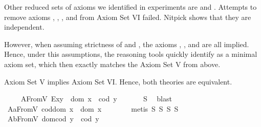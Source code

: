 \begin{isabellebody}
\begin{isamarkuptext}
   Other reduced sets of axioms we identified in experiments are  and
    . Attempts to remove axioms , , 
    , and  from Axiom Set VI failed. Nitpick shows that they are independent. 

   However, when assuming strictness of  and , the axioms , 
   ,  and  are all implied. Hence, under this 
   assumptions, the reasoning tools quickly identify  as a minimal axiom 
   set, which then exactly matches the Axiom Set V from above.%
\end{isamarkuptext}\isamarkuptrue%
%
\begin{isamarkuptext}%
Axiom Set V implies Axiom Set VI. Hence, both theories are equivalent.%
\end{isamarkuptext}\isamarkuptrue%
\isanewline
\ \ \isamarkupfalse%
\ \ A{}FromV{\isacharcolon}\ {\isachardoublequoteopen}E{\isacharparenleft}x{\isasymcdot}y{\isacharparenright}\ \isactrlbold {\isasymleftrightarrow}\ dom\ x\ {\isasymsimeq}\ cod\ y{\isachardoublequoteclose}\ \isanewline
%
\isadelimproof
\ \ \ \ %
\endisadelimproof
%
\isatagproof
{}\isamarkupfalse%
\ S{}\ \isamarkupfalse%
\ blast%
\endisatagproof
{\isafoldproof}%
%
\isadelimproof
\isanewline
%
\endisadelimproof
\ \ \isamarkupfalse%
\ A{}aFromV{\isacharcolon}\ {\isachardoublequoteopen}cod{\isacharparenleft}dom\ x{\isacharparenright}\ {\isasymcong}\ dom\ x{\isachardoublequoteclose}\ \ \isanewline
%
\isadelimproof
\ \ \ \ %
\endisadelimproof
%
\isatagproof
{}\isamarkupfalse%
\ {\isacharparenleft}metis\ S{}\ S{}\ S{}\ S{}{\isacharparenright}%
\endisatagproof
{\isafoldproof}%
%
\isadelimproof
\isanewline
%
\endisadelimproof
\ \ \isamarkupfalse%
\ A{}bFromV{\isacharcolon}\ {\isachardoublequoteopen}dom{\isacharparenleft}cod\ y{\isacharparenright}\ {\isasymcong}\ cod\ y{\isachardoublequoteclose}\ \ \isanewline

\end{isabellebody}
